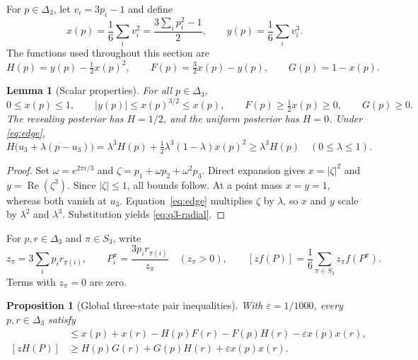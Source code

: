 \documentclass[11pt,reqno]{amsart}
\newtheorem{proposition}[theorem]{Proposition}
\newtheorem{lemma}[theorem]{Lemma}
\theoremstyle{definition}
\theoremstyle{remark}
\newcommand{\eps}{\varepsilon}
\begin{document}
For $p\in\Delta_3$, let $v_i=3p_i-1$ and define
\begin{equation}\label{eq:q3-invariants}
 x(p)=\frac16\sum_i v_i^2=\frac{3\sum_i p_i^2-1}{2},
 \qquad y(p)=\frac16\sum_i v_i^3.
\end{equation}
The functions used throughout this section are
\begin{equation}\label{eq:q3-potential}
 \boxed{H(p)=y(p)-\tfrac12x(p)^2,\qquad
 F(p)=\tfrac32x(p)-y(p),\qquad G(p)=1-x(p).}
\end{equation}

\begin{lemma}[Scalar properties]\label{lem:q3-scalar}
For all $p\in\Delta_3$,
\[
 0\le x(p)\le1,\qquad |y(p)|\le x(p)^{3/2}\le x(p),
 \qquad F(p)\ge\tfrac12x(p)\ge0,\qquad G(p)\ge0.
\]
The revealing posterior has $H=1/2$, and the uniform posterior has $H=0$. Under \eqref{eq:edge},
\begin{equation}\label{eq:q3-radial}
 H\bigl(u_3+\lambda(p-u_3)\bigr)
 =\lambda^3H(p)+\tfrac12\lambda^3(1-\lambda)x(p)^2
 \ge\lambda^3H(p)\quad(0\le\lambda\le1).
\end{equation}
\end{lemma}

\begin{proof}
Set $\omega=e^{2\pi i/3}$ and $\zeta=p_1+\omega p_2+\omega^2p_3$. Direct expansion gives $x=|\zeta|^2$ and $y=\operatorname{Re}(\zeta^3)$. Since $|\zeta|\le1$, all bounds follow. At a point mass $x=y=1$, whereas both vanish at $u_3$. Equation~\eqref{eq:edge} multiplies $\zeta$ by $\lambda$, so $x$ and $y$ scale by $\lambda^2$ and $\lambda^3$. Substitution yields \eqref{eq:q3-radial}.
\end{proof}

For $p,r\in\Delta_3$ and $\pi\in S_3$, write
\begin{equation}\label{eq:q3-orbits}
 z_\pi=3\sum_i p_i r_{\pi(i)},\qquad
 P_i^\pi=\frac{3p_i r_{\pi(i)}}{z_\pi}\quad(z_\pi>0),
 \qquad [zf(P)]=\frac16\sum_{\pi\in S_3}z_\pi f(P^\pi).
\end{equation}
Terms with $z_\pi=0$ are zero.

\begin{proposition}[Global three-state pair inequalities]\label{prop:q3-pair}
With $\eps=1/1000$, every $p,r\in\Delta_3$ satisfy
\begin{align}
 [zx(P)]&\le x(p)+x(r)-H(p)F(r)-F(p)H(r)-\eps x(p)x(r),\label{eq:q3-pair-A}\\
 [zH(P)]&\ge H(p)G(r)+G(p)H(r)+\eps x(p)x(r).\label{eq:q3-pair-B}
\end{align}
\end{proposition}
\end{document}
